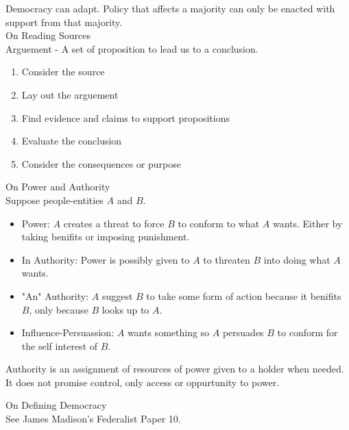 \documentclass{article}
\begin{document}
\noindent
Democracy can adapt. Policy that affects a majority can only be enacted with support from that majority.\\

\noindent
\Large
On Reading Sources\\
\normalsize
\noindent
Arguement - A set of proposition to lead us to a conclusion.

\begin{enumerate}
  \item Consider the source
  \item Lay out the arguement
  \item Find evidence and claims to support propositions
  \item Evaluate the conclusion
  \item Consider the consequences or purpose
\end{enumerate}

\noindent
\Large On Power and Authority\\
\normalsize
\noindent
Suppose people-entities $A$ and $B$.

\centering
{}
\raggedright

\begin{itemize}
  \item Power: $A$ creates a threat to force $B$ to conform to what $A$ wants. Either by taking benifits or imposing punishment.
  \item In Authority: Power is possibly given to $A$ to threaten $B$ into doing what $A$ wants.
  \item "An" Authority: $A$ suggest $B$ to take some form of action because it benifits $B$, only because $B$ looks up to $A$.
  \item Influence-Persuassion: $A$ wants something so $A$ persuades $B$ to conform for the self interest of $B$.
\end{itemize}

\noindent
Authority is an assignment of resources of power given to a holder when needed. It does not promise control, only access or oppurtunity to power.

\noindent
\Large
On Defining Democracy\\
\normalsize
\noindent
See James Madison's Federalist Paper 10.
\end{document}
